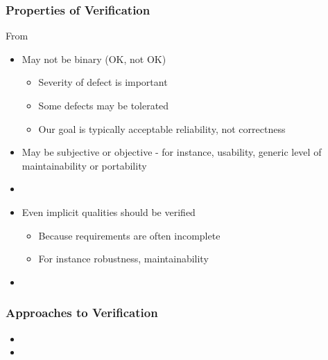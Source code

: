 \documentclass[t,12pt,numbers,fleqn]{beamer}
\begin{document}
\begin{frame}
\frametitle{Properties of Verification}

From \cite{GhezziEtAl2003}

\begin{itemize}

\item May not be binary (OK, not OK)
\begin{itemize}
\item Severity of defect is important
\item Some defects may be tolerated
\item Our goal is typically acceptable reliability, not correctness
\end{itemize}
\item May be subjective or objective - for instance, usability, generic level of
  maintainability or portability
\bi
\item {}
\ei
\item Even implicit qualities should be verified
\begin{itemize}
\item Because requirements are often incomplete
\item For instance robustness, maintainability
\end{itemize}
\item {} %
\end{itemize}

\end{frame}


\begin{frame}
\frametitle{Approaches to Verification}

\begin{itemize}

\item {}
\item {}

\end{itemize}

\end{frame}

\end{document}
